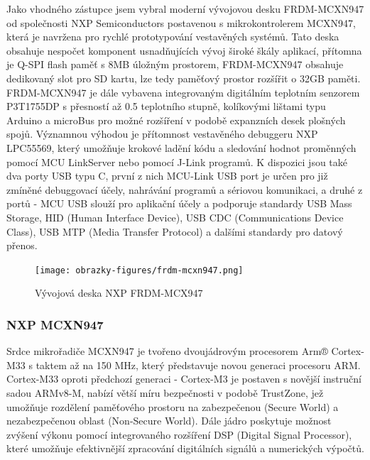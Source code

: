 Jako vhodného zástupce jsem vybral moderní vývojovou desku FRDM-MCXN947 od společnosti NXP Semiconductors postavenou s mikrokontrolerem MCXN947, která je navržena pro rychlé prototypování vestavěných systémů. Tato deska obsahuje nespočet komponent usnadňujících vývoj široké škály aplikací, přítomna je Q-SPI flash paměť s 8MB úložným prostorem, FRDM-MCXN947 obsahuje dedikovaný slot pro SD kartu, lze tedy paměťový prostor rozšířit o 32GB paměti. FRDM-MCXN947 je dále vybavena integrovaným digitálním teplotním senzorem P3T1755DP s přesností až 0.5 teplotního stupně, kolíkovými lištami typu Arduino a microBus pro možné rozšíření v podobě expanzních desek plošných spojů. Významnou výhodou je přítomnost vestavěného debuggeru NXP LPC55569, který umožňuje krokové ladění kódu a sledování hodnot proměnných pomocí MCU LinkServer nebo pomocí J-Link programů. K dispozici jsou také dva porty USB typu C, první z nich MCU-Link USB port je určen pro již zmíněné debuggovací účely, nahrávání programů a sériovou komunikaci, a druhé z portů - MCU USB slouží pro aplikační účely a podporuje standardy USB Mass Storage, HID (Human Interface Device), USB CDC (Communications Device Class), USB MTP (Media Transfer Protocol) a dalšími standardy pro datový přenos. \cite{nxp_MCX_Nx4x_Reference_Manual, nxp_FRDM_MCXN947_getting_started}

\begin{figure}[h]
    \centering
    \texttt{[image: obrazky-figures/frdm-mcxn947.png]}
    
    \caption{Vývojová deska NXP FRDM-MCX947 \cite{nxp_FRDM_MCXN947_getting_started}}
    \label{fig:keelog-airdrive-serial-datalogger}
\end{figure}

\subsubsection{NXP MCXN947}
Srdce mikrořadiče MCXN947 je tvořeno dvoujádrovým procesorem Arm® Cortex-M33 s taktem až na 150 MHz, který představuje novou generaci procesoru ARM. Cortex-M33 oproti předchozí generaci - Cortex-M3 je postaven s novější instruční sadou ARMv8-M, nabízí větší míru bezpečnosti v podobě TrustZone, jež umožňuje rozdělení paměťového prostoru na zabezpečenou (Secure World) a nezabezpečenou oblast (Non-Secure World). Dále jádro poskytuje možnost zvýšení výkonu pomocí integrovaného rozšíření DSP (Digital Signal Processor), které umožňuje efektivnější zpracování digitálních signálů a numerických výpočtů. \cite{nxp_MCX_Nx4x_Reference_Manual}


